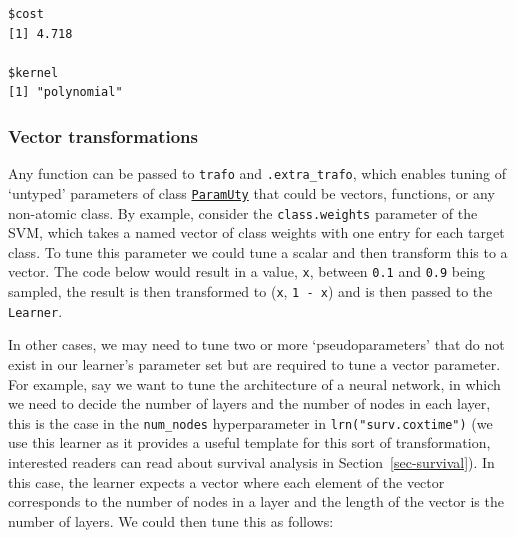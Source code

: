 \begin{verbatim}
$cost
[1] 4.718

$kernel
[1] "polynomial"
\end{verbatim}

\hypertarget{vector-transformations}{%
\subsubsection*{Vector transformations}\label{vector-transformations}}

Any function can be passed to \texttt{trafo} and \texttt{.extra\_trafo},
which enables tuning of `untyped' parameters of class
\href{https://paradox.mlr-org.com/reference/ParamUty.html}{\texttt{ParamUty}}
that could be vectors, functions, or any non-atomic class. By example,
consider the \texttt{class.weights} parameter of the SVM, which takes a
named vector of class weights with one entry for each target class. To
tune this parameter we could tune a scalar and then transform this to a
vector. The code below would result in a value, \texttt{x}, between
\texttt{0.1} and \texttt{0.9} being sampled, the result is then
transformed to (\texttt{x}, \texttt{1\ -\ x}) and is then passed to the
\texttt{Learner}.

\begin{Shaded}
\begin{Highlighting}[]
\OtherTok{=} \NormalTok{(}
   \NormalTok{(} \NormalTok{, } \NormalTok{,}
     \NormalTok{(}  \SpecialCharTok{{-}}
\NormalTok{)}
\end{Highlighting}
\end{Shaded}

In other cases, we may need to tune two or more `pseudoparameters' that
do not exist in our learner's parameter set but are required to tune a
vector parameter. For example, say we want to tune the architecture of a
neural network, in which we need to decide the
number of layers and the number of nodes in each layer, this is the case
in the \texttt{num\_nodes} hyperparameter in
\texttt{lrn("surv.coxtime")} (we use this learner as it provides a
useful template for this sort of transformation, interested readers can
read about survival analysis in Section~\ref{sec-survival}). In this
case, the learner expects a vector where each element of the vector
corresponds to the number of nodes in a layer and the length of the
vector is the number of layers. We could then tune this as follows:

